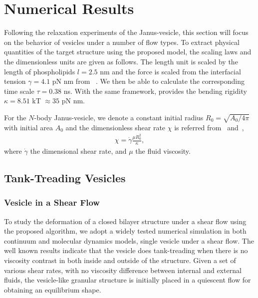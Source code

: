 \documentclass[lineno]{jfm}
\begin{document}


\section{\label{results}Numerical Results}


Following the relaxation experiments of the Janus-vesicle, this section will focus on the behavior of vesicles 
under a number of flow types. To extract physical quantities of the target structure using the proposed model, the scaling laws and the dimensionless units are given as follows.
The length unit is scaled by the length of phospholipids $l=2.5$ nm and the force is scaled from the 
interfacial tension $\gamma=4.1$ pN nm from ~\cite{Ryham16}. We then be able to calculate the corresponding 
time scale $\tau = 0.38$ ns. With the same framework, \cite{Fu20} provides the bending rigidity 
$\kappa=8.51$ kT $\approx35$ pN nm.

For the $N$-body Janus-vesicle, we denote a constant initial radius $R_0=\sqrt{A_0/4\pi}$ with initial area $A_0$ and the dimensionless shear rate $\chi$ is referred from~\cite{Finken08} and~\cite{Shaqfeh11},
\begin{align}
  \chi = \dot\gamma \frac{\mu R_0^2}{\kappa},
\end{align}
%
where $\dot\gamma$ the dimensional shear rate, and $\mu$ the fluid viscosity.


\subsection{Tank-Treading Vesicles}

\subsubsection{Vesicle in a Shear Flow}

To study the deformation of a closed bilayer structure under a shear flow using the proposed algorithm, 
we adopt a widely tested numerical simulation in both continuum and molecular dynamics models, single vesicle under a shear flow. The well known results indicate that the vesicle does tank-treading when there is no viscosity contrast in both inside and outside of the structure.
Given a set of various shear rates, with no viscosity difference between internal and external fluids, 
the vesicle-like granular structure is initially placed in a quiescent flow for obtaining an equilibrium shape.
\end{document}
